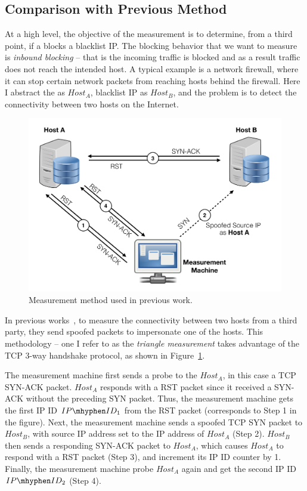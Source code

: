 \subsection{Comparison with Previous Method}

At a high level, the objective of the measurement is to determine, from a third
point, if a {} blocks a blacklist IP. The blocking behavior that we
want to measure is \textit{inbound blocking} -- that is the incoming traffic
is blocked and as a result traffic does not reach the intended host. A
typical example is a network firewall, where it can stop certain network
packets from reaching hosts behind the firewall. Here I abstract the
{} as $Host_A$, blacklist IP as $Host_B$, and the problem is to
detect the connectivity between two hosts on the Internet.

\begin{figure}[t]
\centering
\includegraphics[width=0.8\columnwidth]{data_usage/images/croped_method_old.pdf}
\caption{Measurement method used in previous work.}
\label{fig:old_method}
\end{figure}

In previous works~\cite{pearce2017augur, ensafi2014detecting}, to measure
the connectivity between two hosts from a third party, they send spoofed packets
to impersonate one of the hosts. This methodology -- one I refer
to as the \textit{triangle measurement} takes advantage of the TCP 3-way
handshake protocol, as shown in Figure~\ref{fig:old_method}.

The measurement machine first sends a probe to the $Host_A$, in this case a TCP
SYN-ACK packet. $Host_A$ responds with a RST packet since it received a SYN-ACK
without the preceding SYN packet. Thus, the measurement machine gets the
first IP ID $IP\mhyphen ID_1$ from the RST packet (corresponds to Step 1 in
the figure). Next, the measurement machine sends a spoofed TCP SYN packet to
$Host_B$, with source IP address set to the IP address of $Host_A$ (Step 2).
$Host_B$ then sends a responding SYN-ACK packet to $Host_A$, which causes $Host_A$
to respond with a RST packet (Step 3), and increment its IP ID counter by 1.
Finally, the measurement machine probe $Host_A$ again and get the second IP ID
$IP\mhyphen ID_2$ (Step 4).


